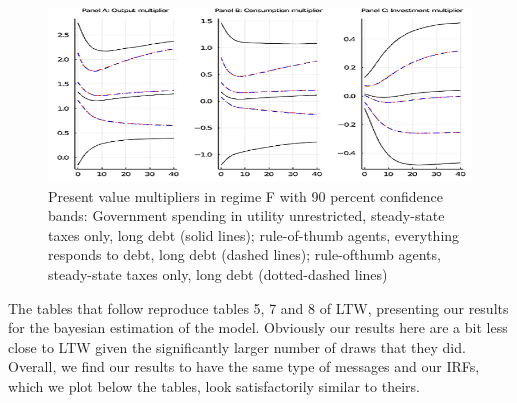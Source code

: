 \documentclass[letterpaper,12pt]{article}%
\begin{document}
\begin{figure}[H]
    \centering
    \includegraphics[width=12cm]{figure2.png}
    \caption{Present value multipliers in regime F with 90 percent confidence bands: Government spending in utility unrestricted, steady-state taxes
only, long debt (solid lines); rule-of-thumb agents, everything responds to debt, long debt (dashed lines); rule-ofthumb
agents, steady-state taxes only, long debt (dotted-dashed lines) }
    \label{fig:my_label}
\end{figure}

The tables that follow reproduce tables 5, 7 and 8 of LTW, presenting our results for the bayesian estimation of the model. Obviously our results here are a bit less close to LTW given the significantly larger number of draws that they did. Overall, we find our results to have the same type of messages and our IRFs, which we plot below the tables, look satisfactorily similar to theirs.
\end{document}
